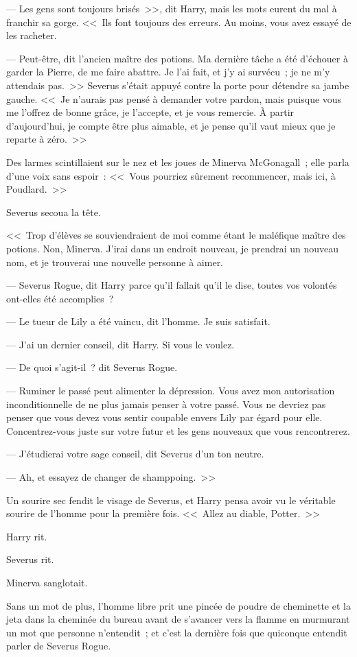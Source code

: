 --- Les gens sont toujours brisés~>>, dit Harry, mais les mots eurent du mal à franchir sa gorge. <<~Ils font toujours des erreurs. Au moins, vous avez essayé de les racheter.

--- Peut-être, dit l'ancien maître des potions. Ma dernière tâche a été d'échouer à garder la Pierre, de me faire abattre. Je l'ai fait, et j'y ai survécu~; je ne m'y attendais pas.~>> Severus s'était appuyé contre la porte pour détendre sa jambe gauche. <<~Je n'aurais pas pensé à demander votre pardon, mais puisque vous me l'offrez de bonne grâce, je l'accepte, et je vous remercie. À partir d'aujourd'hui, je compte être plus aimable, et je pense qu'il vaut mieux que je reparte à zéro.~>>

Des larmes scintillaient sur le nez et les joues de Minerva McGonagall~; elle parla d'une voix sans espoir~: <<~Vous pourriez sûrement recommencer, mais ici, à Poudlard.~>>

Severus secoua la tête.

<<~Trop d'élèves se souviendraient de moi comme étant le maléfique maître des potions. Non, Minerva. J'irai dans un endroit nouveau, je prendrai un nouveau nom, et je trouverai une nouvelle personne à aimer.

--- Severus Rogue, dit Harry parce qu'il fallait qu'il le dise, toutes vos volontés ont-elles été accomplies~?

--- Le tueur de Lily a été vaincu, dit l'homme. Je suis satisfait.

--- J'ai un dernier conseil, dit Harry. Si vous le voulez.

--- De quoi s'agit-il~? dit Severus Rogue.

--- Ruminer le passé peut alimenter la dépression. Vous avez mon autorisation inconditionnelle de ne plus jamais penser à votre passé. Vous ne devriez pas penser que vous devez vous sentir coupable envers Lily par égard pour elle. Concentrez-vous juste sur votre futur et les gens nouveaux que vous rencontrerez.

--- J'étudierai votre sage conseil, dit Severus d'un ton neutre.

--- Ah, et essayez de changer de shamppoing.~>>

Un sourire sec fendit le visage de Severus, et Harry pensa avoir vu le véritable sourire de l'homme pour la première fois. <<~Allez au diable, Potter.~>>

Harry rit.

Severus rit.

Minerva sanglotait.

Sans un mot de plus, l'homme libre prit une pincée de poudre de cheminette et la jeta dans la cheminée du bureau avant de s'avancer vers la flamme en murmurant un mot que personne n'entendit~; et c'est la dernière fois que quiconque entendit parler de Severus Rogue. 
